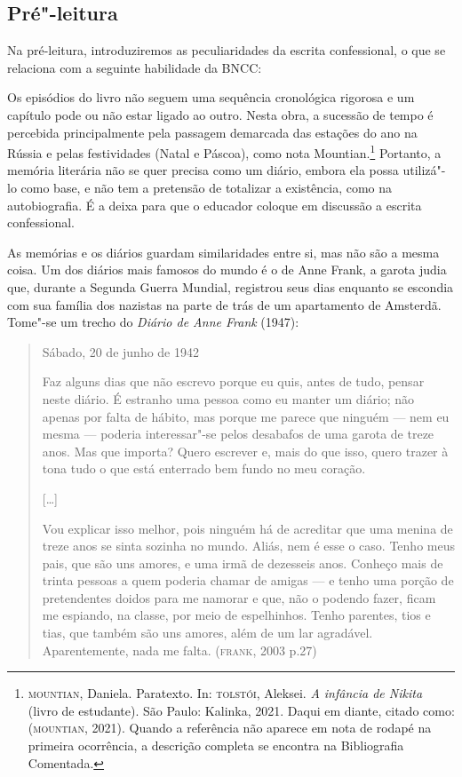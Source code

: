 \documentclass[11pt]{extarticle}
\begin{document}
\subsection{Pré"-leitura}

Na pré-leitura, introduziremos as peculiaridades da escrita confessional, o que se relaciona com a seguinte habilidade da BNCC:

Os episódios do livro não seguem uma sequência cronológica rigorosa e
um capítulo pode ou não estar ligado ao outro. Nesta obra, a sucessão de
tempo é percebida principalmente pela passagem demarcada das estações do
ano na Rússia e pelas festividades (Natal e Páscoa), como nota Mountian.\footnote{\textsc{mountian}, Daniela. Paratexto. In: \textsc{tolstói}, Aleksei. \emph{A infância de Nikita} (livro de estudante). São Paulo: Kalinka, 2021. Daqui em diante, citado como: (\textsc{mountian}, 2021). Quando a referência não aparece em nota de rodapé na primeira ocorrência, a descrição completa se encontra na Bibliografia Comentada.} Portanto, a memória literária não se quer precisa
como um diário, embora ela possa utilizá"-lo como base, e não tem a
pretensão de totalizar a existência, como na autobiografia. É a deixa
para que o educador coloque em discussão a escrita confessional.

As memórias e os diários guardam similaridades entre si, mas não são a
mesma coisa. Um dos diários mais famosos do mundo é o de Anne Frank, a
garota judia que, durante a Segunda Guerra Mundial, registrou seus dias
enquanto se escondia com sua família dos nazistas na parte de trás de um
apartamento de Amsterdã. Tome"-se um trecho do \emph{Diário de Anne
Frank} (1947):

\begin{quote}
Sábado, 20 de junho de 1942

Faz alguns dias que não escrevo porque eu quis, antes de tudo, pensar
neste diário. É estranho uma pessoa como eu manter um diário; não apenas
por falta de hábito, mas porque me parece que ninguém --- nem eu mesma
--- poderia interessar"-se pelos desabafos de uma garota de treze anos.
Mas que importa? Quero escrever e, mais do que isso, quero trazer à tona
tudo o que está enterrado bem fundo no meu coração.

{[}\ldots{}{]}

Vou explicar isso melhor, pois ninguém há de acreditar que uma menina de
treze anos se sinta sozinha no mundo. Aliás, nem é esse o caso. Tenho
meus pais, que são uns amores, e uma irmã de dezesseis anos. Conheço
mais de trinta pessoas a quem poderia chamar de amigas --- e tenho uma
porção de pretendentes doidos para me namorar e que, não o podendo
fazer, ficam me espiando, na classe, por meio de espelhinhos. Tenho
parentes, tios e tias, que também são uns amores, além de um lar
agradável. Aparentemente, nada me falta. (\textsc{frank}, 2003 p.27)
\end{quote}
\end{document}
